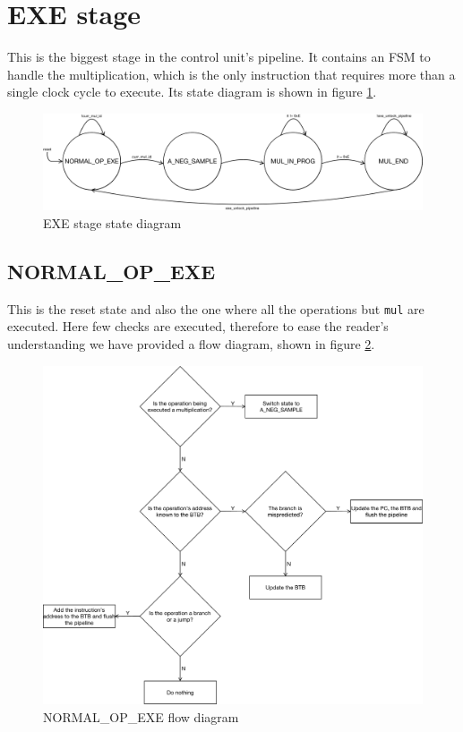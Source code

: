 \section{EXE stage}
\label{sec:cu_exe_stage}

This is the biggest stage in the control unit's pipeline. It contains an FSM to handle the multiplication, which is the only instruction that requires more than a single clock cycle to execute.
Its state diagram is shown in figure \ref{fig:mul_fsm}.

\begin{figure}[!ht]
	\centering
	\includegraphics[width=\linewidth]{./chapters/figures/mul_fsm.pdf}
    \caption{EXE stage state diagram}
    \label{fig:mul_fsm}
\end{figure}

\subsection{NORMAL\_OP\_EXE}

This is the reset state and also the one where all the operations but \verb|mul| are executed. Here few checks are executed, therefore to ease the reader's understanding we have provided a flow diagram,
shown in figure \ref{fig:normal_op_flow_diagram}.

\begin{figure}[!ht]
	\centering
	\includegraphics[width=\linewidth]{./chapters/figures/normal_op_diagram.pdf}
    \caption{NORMAL\_OP\_EXE flow diagram}
    \label{fig:normal_op_flow_diagram}
\end{figure}

